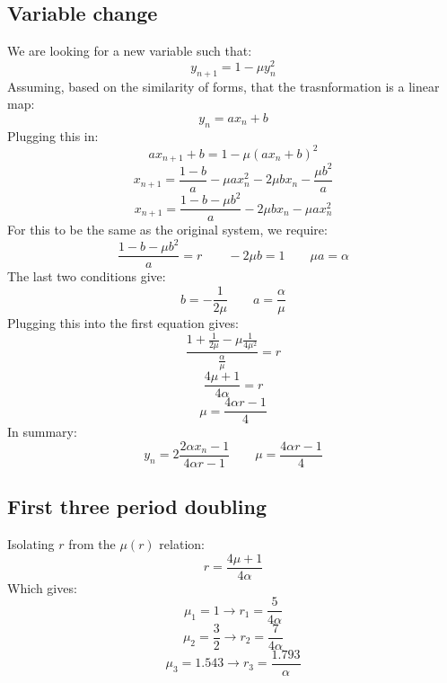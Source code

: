 \documentclass{article}
\begin{document}
\subsection{Variable change}
We are looking for a new variable such that:
\begin{equation}
    y_{n+1} = 1 - \mu y_n^2
\end{equation}
Assuming, based on the similarity of forms, that the trasnformation is a linear map:
\begin{equation}
    y_n = a x_n + b
\end{equation}
Plugging this in:
\begin{equation}
    a x_{n+1} + b = 1 - \mu (a x_n + b)^2
\end{equation}
\begin{equation}
    x_{n+1} = \frac{1 - b}{a} - \mu a x_n^2 - 2\mu bx_n - \frac{\mu b^2}{a}
\end{equation}
\begin{equation}
    x_{n+1} = \frac{1 - b - \mu b^2}{a} - 2\mu bx_n - \mu a x_n^2
\end{equation}
For this to be the same as the original system, we require:
\begin{equation}
    \frac{1 - b - \mu b^2}{a} = r
    \qquad
    - 2\mu b = 1
    \qquad
    \mu a = \alpha
\end{equation}
The last two conditions give:
\begin{equation}
    b = -\frac{1}{2\mu}
    \qquad
    a = \frac{\alpha}{\mu}
\end{equation}
Plugging this into the first equation gives:
\begin{equation}
    \frac{1 + \frac{1}{2\mu} - \mu \frac{1}{4\mu^2}}{\frac{\alpha}{\mu}} = r
\end{equation}
\begin{equation}
    \frac{4 \mu + 1}{4 \alpha} = r
\end{equation}
\begin{equation}
    \mu = \frac{4 \alpha r - 1}{4}
\end{equation}
In summary:
\begin{equation}
    y_n = 2\frac{2 \alpha x_n - 1}{4 \alpha r - 1}
    \qquad
    \mu = \frac{4 \alpha r - 1}{4}
\end{equation}
\subsection{First three period doubling}
Isolating $r$ from the $\mu(r)$ relation:
\begin{equation}
    r = \frac{4\mu + 1}{4\alpha}
\end{equation}
Which gives:
\begin{equation}
    \mu_1 = 1 \rightarrow r_1 = \frac{5}{4\alpha}
\end{equation}
\begin{equation}
    \mu_2 = \frac{3}{2} \rightarrow r_2 = \frac{7}{4\alpha}
\end{equation}
\begin{equation}
    \mu_3 = 1.543 \rightarrow r_3 = \frac{1.793}{\alpha}
\end{equation}
\end{document}
